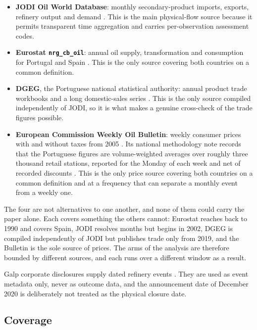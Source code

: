\documentclass[11pt,a4paper]{article}
\begin{document}
\begin{itemize}
\item \textbf{JODI Oil World Database}: monthly secondary-product imports, exports, refinery
output and demand \citep{jodi}. This is the main physical-flow source because it permits
transparent time aggregation and carries per-observation assessment codes.
\item \textbf{Eurostat \texttt{nrg\_cb\_oil}}: annual oil supply, transformation and consumption
for Portugal and Spain \citep{eurostat}. This is the only source covering both countries on a
common definition.
\item \textbf{DGEG}, the Portuguese national statistical authority: annual product trade
workbooks and a long domestic-sales series \citep{dgegtrade, dgegsales}. This is the only
source compiled independently of
JODI, so it is what makes a genuine cross-check of the trade figures possible.
\item \textbf{European Commission Weekly Oil Bulletin}: weekly consumer prices with and without
taxes from 2005 \citep{oilbulletin}. Its national methodology note records that the Portuguese
figures are volume-weighted averages over roughly three thousand retail stations, reported for
the Monday of each week and net of recorded discounts \citep{ec_wob_methodology}. This is the
only price source covering both countries on a common definition
and at a frequency that can separate a monthly event from a weekly one.
\end{itemize}

The four are not alternatives to one another, and none of them could carry the paper alone. Each
covers something the others cannot: Eurostat reaches back to 1990 and covers Spain, JODI
resolves months but begins in 2002, DGEG is compiled independently of JODI but publishes trade
only from 2019, and the Bulletin is the sole source of prices. The arms of the analysis are
therefore bounded by different sources, and each runs over a different window as a result.

Galp corporate disclosures supply dated refinery events \citep{galphydrocracker, galpmatosinhos, galprussian}. They are used as event metadata only, never as outcome data, and the announcement date of December
2020 is deliberately not treated as the physical closure date.

\subsection{Coverage}
\label{sec:coverage}
\end{document}
